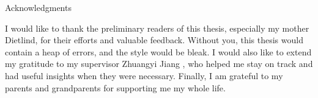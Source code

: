 \thispagestyle{empty}

\vspace*{20mm}

\begin{center}
{ Acknowledgments}
\end{center}

\vspace{10mm}

I would like to thank the preliminary readers of this thesis, especially my mother Dietlind, for their efforts and valuable feedback.
Without you, this thesis would contain a heap of errors, and the style would be bleak.
I would also like to extend my gratitude to my supervisor Zhuangyi Jiang
, who helped me stay on track and had useful insights when they were necessary.
Finally, I am grateful to my parents and grandparents for supporting me my whole life.

\cleardoublepage{}
